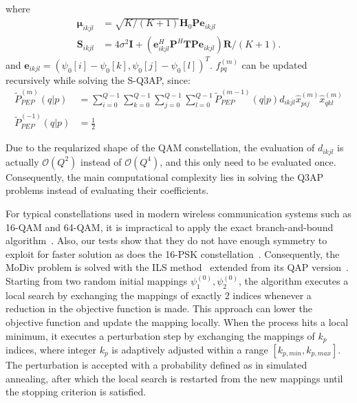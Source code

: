 \documentclass[journal,draftcls,onecolumn,12pt,twoside]{IEEEtran}
\begin{document}
where 
\begin{subequations}
  \begin{align}
    \bm{\mu}_{ikjl} & = \sqrt{K/(K+1)}\mathbf{H}_0\mathbf{P}\mathbf{e}_{ikjl} \\
    \mathbf{S}_{ikjl} & = 4\sigma^2\mathbf{I} +
    (\mathbf{e}_{ikjl}^H\mathbf{P}^H \mathbf{T}
    \mathbf{P}\mathbf{e}_{ikjl})\mathbf{R} / (K+1).
  \end{align}
\end{subequations}
and $\mathbf{e}_{ikjl} =
(\psi_0[i] - \psi_0[k], \psi_0[j] - \psi_0[l])^T$.
$f_{pq}^{(m)}$ can be updated recursively while solving the S-Q3AP, since:
\begin{subequations}
  \begin{align}
    \tilde{P}_{PEP}^{(m)}(q|p) & =
    \sum_{i=0}^{Q-1}\sum_{k=0}^{Q-1}\sum_{j=0}^{Q-1}
    \sum_{l=0}^{Q-1}\tilde{P}_{PEP}^{(m-1)}(q|p)d_{ikjl}
    \hat{x}_{pij}^{(m)}\hat{x}_{qkl}^{(m)}
    \\
    \tilde{P}_{PEP}^{(-1)}(q|p) & = \frac{1}{2}
  \end{align}
  \label{eq:pep_update}
\end{subequations}

Due to the reqularized shape of the QAM constellation, the evaluation of
$d_{ikjl}$ is actually $\mathcal{O}(Q^2)$ instead of $\mathcal{O}(Q^4)$, and
this only need to be evaluated once. Consequently, the main computational
complexity lies in solving the Q3AP problems instead of evaluating their
coefficients.

For typical constellations used in modern wireless communication systems such as
16-QAM and 64-QAM, it is impractical to apply the exact branch-and-bound
algorithm~\cite{hahn2008quadratic}. Also, our tests show that they do not have
enough symmetry to exploit for faster solution as does the 16-PSK
constellation~\cite{mittelmann2015solving}.
Consequently, the MoDiv problem is solved with the ILS
method~\cite{hahn2008quadratic} extended from its QAP
version~\cite{stutzle2006iterated}. Starting from two random initial mappings
$\psi_1^{(0)}, \psi_2^{(0)}$, the algorithm executes a local search by
exchanging the mappings of exactly 2 indices whenever a reduction in the
objective function is made. This approach can lower the objective function and
update the mapping locally. When the process hits a local minimum, it executes a
perturbation step by exchanging the mappings of $k_p$ indices, where integer
$k_p$ is adaptively adjusted within a range $[k_{p,min}, k_{p,max}]$. The
perturbation is accepted with a probability defined as in simulated annealing,
after which the local search is restarted from the new mappings until the
stopping criterion is satisfied.
\end{document}
